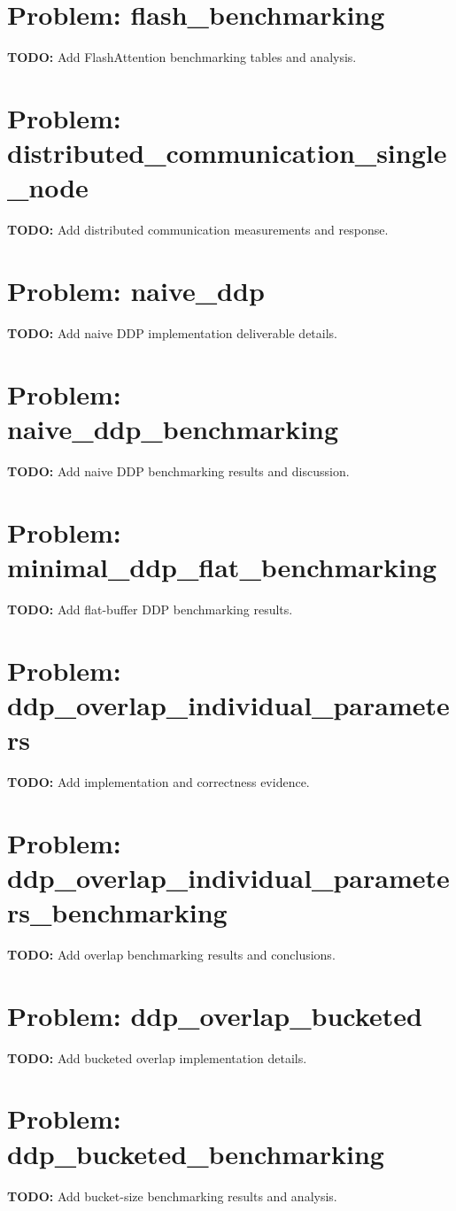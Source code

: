 \documentclass[11pt]{article}
\begin{document}
\section{Problem: flash\_benchmarking}
\textbf{TODO:} Add FlashAttention benchmarking tables and analysis.

\section{Problem: distributed\_communication\_single\_node}
\textbf{TODO:} Add distributed communication measurements and response.

\section{Problem: naive\_ddp}
\textbf{TODO:} Add naive DDP implementation deliverable details.

\section{Problem: naive\_ddp\_benchmarking}
\textbf{TODO:} Add naive DDP benchmarking results and discussion.

\section{Problem: minimal\_ddp\_flat\_benchmarking}
\textbf{TODO:} Add flat-buffer DDP benchmarking results.

\section{Problem: ddp\_overlap\_individual\_parameters}
\textbf{TODO:} Add implementation and correctness evidence.

\section{Problem: ddp\_overlap\_individual\_parameters\_benchmarking}
\textbf{TODO:} Add overlap benchmarking results and conclusions.

\section{Problem: ddp\_overlap\_bucketed}
\textbf{TODO:} Add bucketed overlap implementation details.

\section{Problem: ddp\_bucketed\_benchmarking}
\textbf{TODO:} Add bucket-size benchmarking results and analysis.
\end{document}
